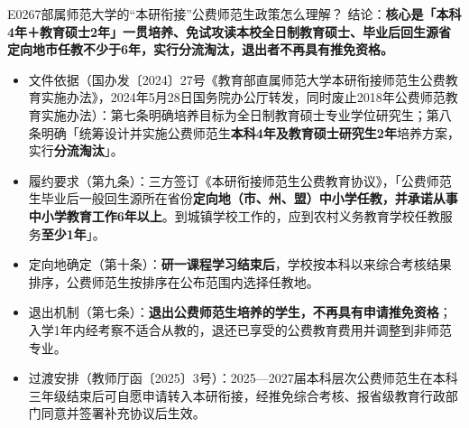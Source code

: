 \begin{qa}{E0267}{部属师范大学的“本研衔接”公费师范生政策怎么理解？}
结论：\textbf{核心是「本科4年＋教育硕士2年」一贯培养、免试攻读本校全日制教育硕士、毕业后回生源省定向地市任教不少于6年，实行分流淘汰，退出者不再具有推免资格。}
\begin{itemize}
  \item 文件依据（国办发〔2024〕27号《教育部直属师范大学本研衔接师范生公费教育实施办法》，2024年5月28日国务院办公厅转发，同时废止2018年公费师范教育实施办法）：第七条明确培养目标为全日制教育硕士专业学位研究生；第八条明确「统筹设计并实施公费师范生\textbf{本科4年及教育硕士研究生2年}培养方案，实行\textbf{分流淘汰}」。
  \item 履约要求（第九条）：三方签订《本研衔接师范生公费教育协议》，「公费师范生毕业后一般回生源所在省份\textbf{定向地（市、州、盟）中小学任教，并承诺从事中小学教育工作6年以上}。到城镇学校工作的，应到农村义务教育学校任教服务\textbf{至少1年}」。
  \item 定向地确定（第十条）：\textbf{研一课程学习结束后}，学校按本科以来综合考核结果排序，公费师范生按排序在公布范围内选择任教地。
  \item 退出机制（第七条）：\textbf{退出公费师范生培养的学生，不再具有申请推免资格}；入学1年内经考察不适合从教的，退还已享受的公费教育费用并调整到非师范专业。
  \item 过渡安排（教师厅函〔2025〕3号）：2025—2027届本科层次公费师范生在本科三年级结束后可自愿申请转入本研衔接，经推免综合考核、报省级教育行政部门同意并签署补充协议后生效。
\end{itemize}
\end{qa}


